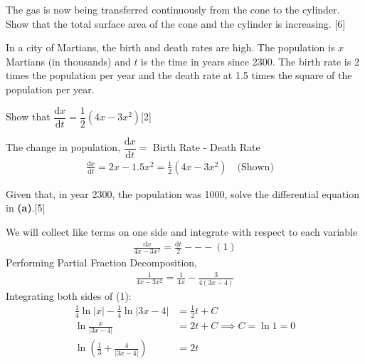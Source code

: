 \documentclass[12pt, a4 paper]{article}
\begin{document}
\begin{outline}[enumerate]
 \2 The gas is now being transferred continuously from the cone to the cylinder. Show that the total surface area of the cone and the cylinder is increasing. \hfill[6]

 \1 In a city of Martians, the birth and death rates are high. The population is $x$ Martians (in thousands) and $t$ is the time in years since 2300. The birth rate is 2 times the population per year and the death rate at 1.5 times the square of the population per year. %

 \2 Show that $\dfrac{{{\textrm{d}}x}}{{{\textrm{d}}t}} = \dfrac{1}{2}(4x - 3{x^2})$\hfill[2]
 \begin{answer}
   The change in population, $\dfrac{{{\textrm{d}}x}}{{{\textrm{d}}t}} =$ Birth Rate - Death Rate
   \begin{align*}
     \frac{{{\textrm{d}}x}}{{{\textrm{d}}t}} = 2x-1.5x^2 =\frac{1}{2}(4x - 3{x^2}) \quad\textrm{(Shown)}\quad
   \end{align*}
 \end{answer}
 \2 Given that, in year 2300, the population was 1000, solve the differential equation in \textbf{(a)}.\hfill[5]
 \begin{answer}
   We will collect like terms on one side and integrate with respect to each variable
   \begin{align*}
     \frac{\mathrm{d}x}{4x-3x^2} = \frac{\mathrm{d}t}{2} ---(1)
   \end{align*}
   Performing Partial Fraction Decomposition,
   \begin{align*}
     \frac{1}{4x-3x^2} = \frac{1}{4x} - \frac{3}{4(3x-4)}
   \end{align*}
   Integrating both sides of (1):
   \begin{align*}
     \frac{1}{4}\ln{|x|} - \frac{1}{4}\ln{|3x-4|}  &= \frac{1}{2}t + C \\
     \ln{\frac{x}{|3x-4|}} &= 2t + C \implies C = \ln1 = 0\\
     \ln{\left(\frac{1}{3}+\frac{4}{|3x-4|}\right)} &= 2t
   \end{align*}
 \end{answer}



\end{outline}
\end{document}

